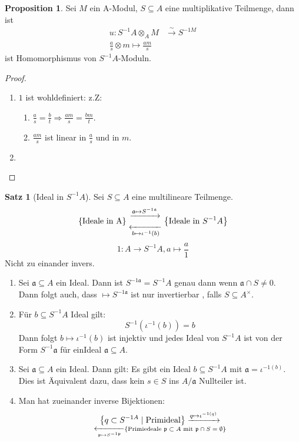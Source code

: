\documentclass[10pt,a4paper]{article}
\newcommand{\inj}{\xrightarrow{\sim}}
\newcounter{thm}[section]
\theoremstyle{definition}
\newtheorem{satz}[thm]{Satz}
\newtheorem{prop}[thm]{Proposition}
\theoremstyle{plain}
\theoremstyle{remark}
\begin{document}
\begin{prop}
	Sei $M$ ein A-Modul, $S\subseteq A$ eine multiplikative Teilmenge, dann ist
	\begin{align*}
	u:S^{-1}A\otimes_A M&\inj S^{-1 M}\\
	\frac{a}{s}\otimes m\mapsto \frac{am}{s}
	\end{align*}
	ist Homomorphismus von $S^{-1}A$-Moduln.
\end{prop}
\begin{proof}
	\begin{enumerate}
		\item $1$ ist wohldefiniert: z.Z:
		\begin{enumerate}
			\item $\frac{a}{s}=\frac{b}{t}\Rightarrow \frac{am}{s}=\frac{bm}{t}$.
			\item $\frac{am}{s}$ ist linear in $\frac{a}{s}$ und in $m$.
		\end{enumerate}
		\item %
	\end{enumerate}
\end{proof}
\begin{satz}[Ideal in $S^{-1}A$]
	Sei $S\subseteq A$ eine multilineare Teilmenge.
	\begin{align*}
	\left\{\text{Ideale in A}\right\}
	{\xrightarrow{\mathfrak a\mapsto S^{-1\mathfrak a}}\atop \xleftarrow[b\mapsto \iota^{-1}(b)]{}
	}\left\{\text{Ideale in $S^{-1}A$}\right\}
	\end{align*}
	\[1:A\rightarrow S^{-1}A,a\mapsto \frac{a}{1}\]
	Nicht zu einander invers.
	\begin{enumerate}
		\item Sei $\mathfrak a\subseteq A$ ein Ideal. Dann ist $S^{-1\mathfrak a}=S^{-1}A$ genau dann wenn $\mathfrak a\cap S\neq 0$.\\
		Dann folgt auch, dass $\mathfrak\mapsto S^{-1\mathfrak a}$ ist nur invertierbar , falls $S\subseteq A^\times$.
		\item Für $b\subseteq S^{-1}A$ Ideal gilt:\\
		\[S^{-1}(\iota^{-1}(b))=b\]
		Dann folgt $b\mapsto\iota^{-1}(b)$ ist injektiv und jedes Ideal von $S^{-1}A$ ist von der Form $S^{-1}\mathfrak a$ für einIdeal $\mathfrak a\subseteq A$.
		\item Sei $\mathfrak a\subseteq A$ ein Ideal. Dann gilt:
		Es gibt ein Ideal $b\subseteq S^{-1}A$ mit $\mathfrak a=\iota^{-1(b)}$.\\
		Dies ist Äquivalent dazu, dass kein $s\in S$ ins $A/\mathfrak a$ Nullteiler ist.
		\item Man hat zueinander inverse Bijektionen: \label{4104}
		\[\left\{q\subset S^{-1 A}\mid \text{Primideal}\right\}
		\xrightarrow{q\mapsto\iota^{-1(q)}}\atop\xleftarrow[\mathfrak p\mapsto S^{-1\mathfrak p}]{}\left\{\text{Primiedeale $\mathfrak p\subset A$ mit $\mathfrak p\cap S=\emptyset$}\right\}
		\]
	\end{enumerate}
\end{satz}
\end{document}
